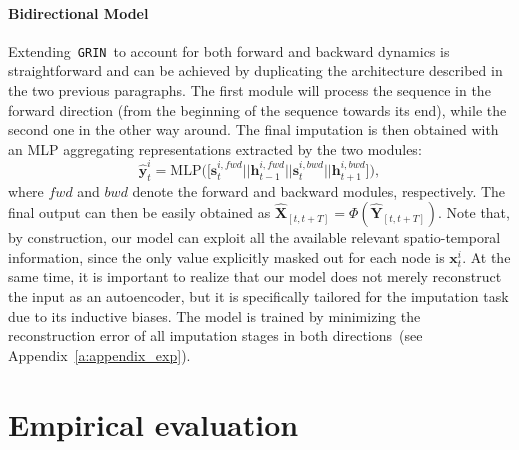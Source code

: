 \documentclass{article} \usepackage{iclr2022_conference,times}
\def\vh{{\bm{h}}}
\def\vs{{\bm{s}}}
\def\vx{{\bm{x}}}
\def\vy{{\bm{y}}}
\def\mX{{\bm{X}}}
\def\mY{{\bm{Y}}}
\newcommand{\GRIL}{\texttt{GRIN}}
\begin{document}
\paragraph{Bidirectional Model} Extending~\GRIL\ to account for both forward and backward dynamics is straightforward and can be achieved by duplicating the architecture described in the two previous paragraphs. The first module will process the sequence in the forward direction (from the beginning of the sequence towards its end), while the second one in the other way around. The final imputation is then obtained with an MLP aggregating representations extracted by the two modules:
\begin{equation}
    \widehat\vy^i_{t} = \text{MLP} \big( \big[ \vs_{t}^{i,fwd}||\vh_{t-1}^{i,fwd}||\vs_{t}^{i,bwd}||\vh_{t+1}^{i,bwd} \big] \big) ,
\end{equation}
where $fwd$ and $bwd$ denote the forward and backward modules, respectively. The final output can then be easily obtained as $\widehat\mX_{[t,t+T]} = \Phi(\widehat\mY_{[t,t+T]})$. Note that, by construction, our model can exploit all the available relevant spatio-temporal information, since the only value explicitly masked out for each node is $\vx_t^i$. At the same time, it is important to realize that our model does not merely reconstruct the input as an autoencoder, but it is specifically tailored for the imputation task due to its inductive biases. The model is trained by minimizing the reconstruction error of all imputation stages in both directions~(see Appendix~\ref{a:appendix_exp}).


\section{Empirical evaluation}\label{s:experiments}
\end{document}

